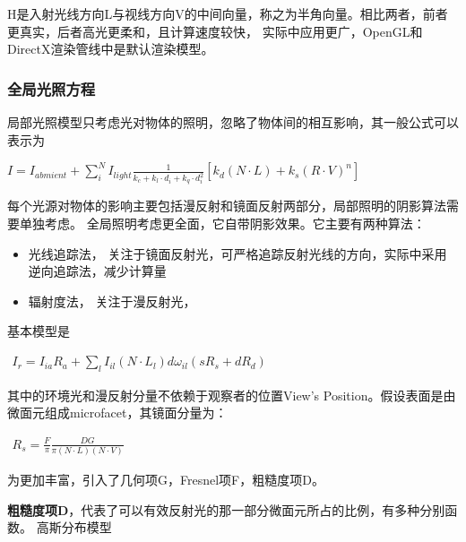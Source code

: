 H是入射光线方向L与视线方向V的中间向量，称之为半角向量。相比两者，前者更真实，后者高光更柔和，且计算速度较快，
实际中应用更广，OpenGL和DirectX渲染管线中是默认渲染模型。


\subsubsection{全局光照方程}

局部光照模型只考虑光对物体的照明，忽略了物体间的相互影响，其一般公式可以表示为

\begin{math}
    I = I_{abmient} + \sum_{i}^{N}I_{light}\frac{1}{k_{c}+k_{l} \cdot d_{i} + k_{q} \cdot d_{i}^2}
    \left[ k_{d}(N \cdot L) + k_{s}(R \cdot V)^n \right]
\end{math}

每个光源对物体的影响主要包括漫反射和镜面反射两部分，局部照明的阴影算法需要单独考虑。
\newline
全局照明考虑更全面，它自带阴影效果。它主要有两种算法：
\begin{itemize}
    \item {光线追踪法， 关注于镜面反射光，可严格追踪反射光线的方向，实际中采用逆向追踪法，减少计算量}
    \item {辐射度法， 关注于漫反射光，}
\end{itemize}
基本模型是 
\newline

\begin{math}
    \begin{aligned}
        I_r = I_{ia}R_{a} + \sum_{l}I_{il}(N \cdot L_{l})d \omega_{il}(sR_{s} + dR_{d})
    \end{aligned}
\end{math}

其中的环境光和漫反射分量不依赖于观察者的位置View's Position。假设表面是由微面元组成microfacet，其镜面分量为：
\newline

\begin{math}
    \begin{aligned}
        R_s = \frac{F}{\pi} \frac{DG}{\pi (N \cdot L)(N \cdot V)}
    \end{aligned}
\end{math}

为更加丰富，引入了几何项G，Fresnel项F，粗糙度项D。
\newline

\textbf{粗糙度项D}，代表了可以有效反射光的那一部分微面元所占的比例，有多种分别函数。
高斯分布模型
\newline

